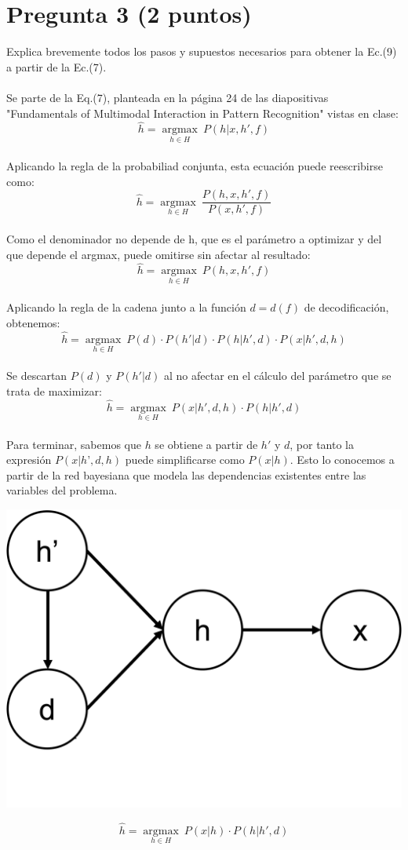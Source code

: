 \documentclass[12pt]{article}
\begin{document}
\section*{Pregunta 3 (2 puntos)}
Explica brevemente todos los pasos y supuestos necesarios para obtener la Ec.(9) a partir de la Ec.(7).
\\\\
Se parte de la Eq.(7), planteada en la página 24 de las diapositivas "Fundamentals of Multimodal Interaction in Pattern Recognition" vistas en clase:
\begin{equation*}
    \hat{h} = \underset{h \in H}{\operatorname{argmax}} ~ P(h|x, h', f)
\end{equation*}
\\
Aplicando la regla de la probabiliad conjunta, esta ecuación puede reescribirse como:
\begin{equation*}
    \hat{h} = \underset{h \in H}{\operatorname{argmax}} ~ \frac{P(h, x, h', f)}{P(x, h', f)}
\end{equation*}
\\
Como el denominador no depende de h, que es el parámetro a optimizar y del que depende el argmax, puede omitirse sin afectar al resultado:
\begin{equation*}
    \hat{h} = \underset{h \in H}{\operatorname{argmax}} ~ P(h, x, h', f)
\end{equation*}
\\
Aplicando la regla de la cadena  junto a la función $d = d(f)$ de decodificación, obtenemos: 
\begin{equation*}
    \hat{h} = \underset{h \in H}{\operatorname{argmax}} ~ P(d) \cdot P(h'|d) \cdot P(h|h', d) \cdot P(x | h', d ,h)
\end{equation*}
\\
Se descartan $P(d)$ y $P(h'| d)$ al no afectar en el cálculo del parámetro que se trata de maximizar:
\begin{equation*}
    \hat{h} = \underset{h \in H}{\operatorname{argmax}} ~ P(x | h', d ,h) \cdot P(h|h', d)
\end{equation*}
\\
Para terminar, sabemos que $h$ se obtiene a partir de $h'$ y $d$, por tanto la expresión $P(x | h’, d, h)$ puede simplificarse como $P(x | h)$. 
Esto lo conocemos a partir de la red bayesiana que modela las dependencias existentes entre las variables del problema. 

\begin{center}
    \includegraphics[width=0.25\columnwidth]{p2.png}
\end{center}
\begin{equation*}
    \hat{h} = \underset{h \in H}{\operatorname{argmax}} ~ P(x | h) \cdot P(h|h', d)
\end{equation*}
\end{document}
